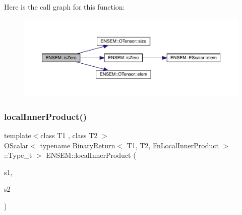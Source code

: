 Here is the call graph for this function\+:\nopagebreak
\begin{figure}[H]
\begin{center}
\leavevmode
\includegraphics[width=350pt]{de/d87/group__obstensor_ga9520741647696623fb9f0d8398f50568_cgraph}
\end{center}
\end{figure}
\mbox{\label{group__obstensor_gaffb6c3d07f9c4ba10a5712ce49725d68}} 
\subsubsection{\texorpdfstring{localInnerProduct()}{localInnerProduct()}}
{\footnotesize\ttfamily template$<$class T1 , class T2 $>$ \\
\mbox{\hyperlink{classENSEM_1_1OScalar}{O\+Scalar}}$<$ typename \mbox{\hyperlink{structENSEM_1_1BinaryReturn}{Binary\+Return}}$<$ T1, T2, \mbox{\hyperlink{structENSEM_1_1FnLocalInnerProduct}{Fn\+Local\+Inner\+Product}} $>$\+::Type\+\_\+t $>$ E\+N\+S\+E\+M\+::local\+Inner\+Product (\begin{DoxyParamCaption}\item[{const \mbox{\hyperlink{classENSEM_1_1OTensor}{O\+Tensor}}$<$ T1 $>$ \&}]{s1,  }\item[{const \mbox{\hyperlink{classENSEM_1_1OTensor}{O\+Tensor}}$<$ T2 $>$ \&}]{s2 }\end{DoxyParamCaption})\hspace{0.3cm}{\ttfamily [inline]}}

